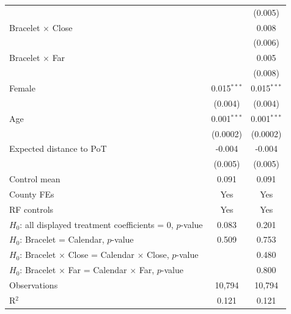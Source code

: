 {\begin{tabular}{lcc}
                                                                         &               & (0.005)\\   
   Bracelet $\times$ Close                                               &               & 0.008\\   
                                                                         &               & (0.006)\\   
   Bracelet $\times$ Far                                                 &               & 0.005\\   
                                                                         &               & (0.008)\\   
   \addlinespace[0.4em]
   Female                                                                & 0.015$^{***}$ & 0.015$^{***}$\\   
                                                                         & (0.004)       & (0.004)\\   
   Age                                                                   & 0.001$^{***}$ & 0.001$^{***}$\\   
                                                                         & (0.0002)      & (0.0002)\\   
   Expected distance to PoT                                              & -0.004        & -0.004\\   
                                                                         & (0.005)       & (0.005)\\   
   Control mean                                                          & 0.091         & 0.091\\  
   County FEs                                                            & Yes           & Yes\\  
   RF controls                                                           & Yes           & Yes\\  
   $H_0$: all displayed treatment coefficients = 0, $p$-value            & 0.083         & 0.201\\  
   $H_0$: Bracelet = Calendar, $p$-value                                 & 0.509         & 0.753\\  
   $H_0$: Bracelet $\times$ Close = Calendar $\times$ Close, $p$-value   &               & 0.480\\  
   $H_0$: Bracelet $\times$ Far = Calendar $\times$ Far, $p$-value       &               & 0.800\\  
   \midrule
   Observations                                                          & 10,794        & 10,794\\  
   R$^2$                                                                 & 0.121         & 0.121\\  
   \midrule \midrule
\end{tabular}}


